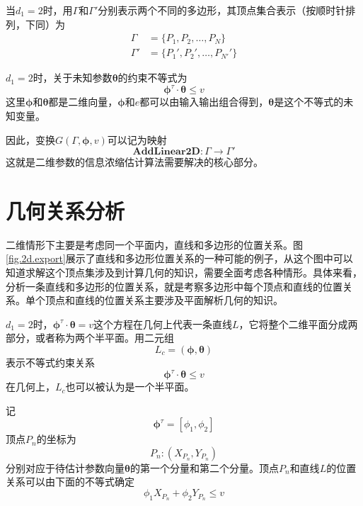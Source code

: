 当$d_{1}=2$时，用$\Gamma$和$\Gamma'$分别表示两个不同的多边形，其顶点集合表示（按顺时针排列，下同）为
\begin{equation*}%
\begin{split}%
\Gamma&=\{P_{1},P_{2},\ldots,P_{N}\}\\
\Gamma'&=\{P_{1}',P_{2}',\ldots,P_{N'}'\}
\end{split}
\end{equation*}

$d_{1}=2$时，关于未知参数$\bm{\theta}$的约束不等式为
\begin{equation}\label{eq.3.L}
\bm{\phi}^{\tau}\cdot\bm{\theta}\leq v
\end{equation}
这里$\bm{\phi}$和$\bm{\theta}$都是二维向量，$\bm{\phi}$和$e$都可以由输入输出组合得到，$\bm{\theta}$是这个不等式的未知变量。

因此，变换$G(\Gamma,\bm{\phi},v)$可以记为映射
\begin{equation}%
\mathbf{AddLinear2D}\colon \Gamma\rightarrow\Gamma'
\end{equation}
这就是二维参数的信息浓缩估计算法需要解决的核心部分。

\section{几何关系分析}\label{sect:3.2}
二维情形下主要是考虑同一个平面内，直线和多边形的位置关系。图\ref{fig.2d.export}展示了直线和多边形位置关系的一种可能的例子，从这个图中可以知道求解这个顶点集涉及到计算几何的知识，需要全面考虑各种情形。具体来看，分析一条直线和多边形的位置关系，就是考察多边形中每个顶点和直线的位置关系。单个顶点和直线的位置关系主要涉及平面解析几何的知识。

$d_{1}=2$时，$\bm{\phi}^{\tau}\cdot\bm{\theta}=v$这个方程在几何上代表一条直线$L$，它将整个二维平面分成两部分，或者称为两个半平面。用二元组
$$L_{c}=(\bm{\phi},\bm{\theta})$$
表示不等式约束关系
\begin{equation}\label{eq.3.neq}
\bm{\phi}^{\tau}\cdot\bm{\theta}\leq v
\end{equation}
在几何上，$L_{c}$也可以被认为是一个半平面。

记
$$\bm{\phi}^{\tau}=[\phi_{1},\phi_{2}]$$
顶点$P_{n}$的坐标为
$$P_{n}\colon (X_{P_{n}},Y_{P_{n}})$$
分别对应于待估计参数向量$\bm{\theta}$的第一个分量和第二个分量。顶点$P_{n}$和直线$L$的位置关系可以由下面的不等式确定
\begin{equation}\label{eq.3.L.P}
\phi_{1}X_{P_{n}}+\phi_{2}Y_{P_{n}}\leq v
\end{equation}

